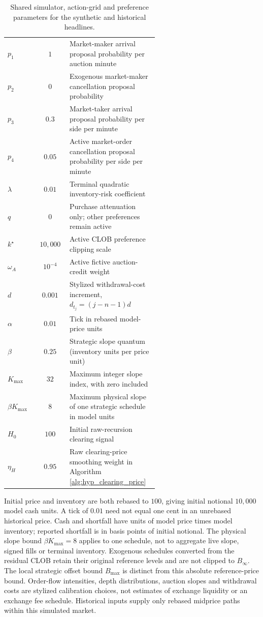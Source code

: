 \documentclass[11pt]{article}
\begin{document}
\begin{table}[ht!]
\begin{tabular}{lcp{0.59\linewidth}}
$p_1$ & $1$ & Market-maker arrival proposal probability per auction minute \\
$p_2$ & $0$ & Exogenous market-maker cancellation proposal probability \\
$p_3$ & $0.3$ & Market-taker arrival proposal probability per side per minute \\
$p_4$ & $0.05$ & Active market-order cancellation proposal probability per side per minute \\
$\lambda$ & $0.01$ & Terminal quadratic inventory-risk coefficient \\
$q$ & $0$ & Purchase attenuation only; other preferences remain active \\
$k^\star$ & $10{,}000$ & Active CLOB preference clipping scale \\
$\omega_A$ & $10^{-4}$ & Active fictive auction-credit weight \\
$d$ & $0.001$ & Stylized withdrawal-cost increment, {$d_{t_j}=(j-n-1)d$} \\
$\alpha$ & $0.01$ & Tick in rebased model-price units \\
$\beta$ & $0.25$ & Strategic slope quantum (inventory units per price unit) \\
$K_{\max}$ & $32$ & Maximum integer slope index, with zero included \\
$\beta K_{\max}$ & $8$ & Maximum physical slope of one strategic schedule in model units \\
$H_0$ & $100$ & Initial raw-recursion clearing signal \\
$\eta_H$ & $0.95$ & Raw clearing-price smoothing weight in Algorithm \ref{alg:hyp_clearing_price} \\
\bottomrule
\end{tabular}
\caption{Shared simulator, action-grid and preference parameters for the synthetic and historical headlines.}
\label{tab:params_generative}
\end{table}

Initial price and inventory are both rebased to $100$, giving initial notional $10{,}000$ model cash units. A tick of $0.01$ need not equal one cent in an unrebased historical price. Cash and shortfall have units of model price times model inventory; reported shortfall is in basis points of initial notional. The physical slope bound $\beta K_{\max}=8$ applies to one schedule, not to aggregate live slope, signed fills or terminal inventory. Exogenous schedules converted from the residual CLOB retain their original reference levels and are not clipped to $B_\infty$. The local strategic offset bound $B_{\max}$ is distinct from this absolute reference-price bound. Order-flow intensities, depth distributions, auction slopes and withdrawal costs are stylized calibration choices, not estimates of exchange liquidity or an exchange fee schedule. Historical inputs supply only rebased midprice paths within this simulated market.
\endgroup
\end{document}
